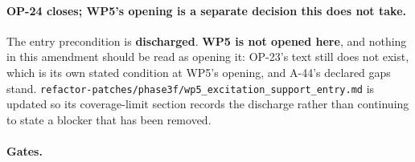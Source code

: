 \documentclass[
  10pt,
]{article}
\begin{document}
\paragraph{OP-24 closes; WP5's opening is a separate decision this does not take.}
The entry precondition is \textbf{discharged}. \textbf{WP5 is not opened here}, and nothing in this amendment should be read as opening it: OP-23's text still does not exist, which is its own stated condition at WP5's opening, and A-44's declared gaps stand. \texttt{refactor-patches/\allowbreak{}phase3f/\allowbreak{}wp5\_excitation\_support\_entry.md} is updated so its coverage-limit section records the discharge rather than continuing to state a blocker that has been removed.

\paragraph{Gates.}
\end{document}
